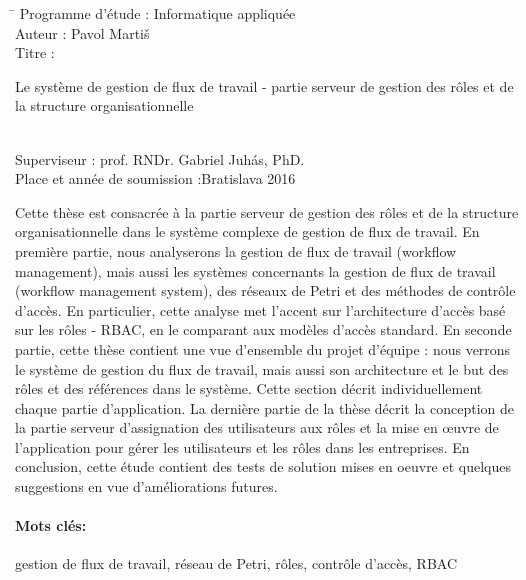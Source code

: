 \documentclass[12pt, oneside]{book}
\def\mfautor{Pavol Martiš}
\begin{document}
\begin{tabbing}	
	\hspace*{7cm}\= \kill
	Programme d'étude :\> Informatique appliquée \\
	Auteur :\> \mfautor\\
	Titre :\>
	\begin{minipage}[t]{20em}
	Le système de gestion de flux de travail - partie serveur de gestion des rôles et de la structure organisationnelle
	\end{minipage} \\
	Superviseur :\> prof. RNDr. Gabriel Juhás, PhD.\\
	
	Place et année de soumission :\>Bratislava 2016
\end{tabbing}
Cette thèse est consacrée à la partie serveur de gestion des rôles et de la structure organisationnelle dans le système complexe de gestion de flux de travail.
En première partie, nous analyserons la gestion de flux de travail (workflow management), mais aussi les systèmes concernants la gestion de flux de travail (workflow management system), des réseaux de Petri et des méthodes de contrôle d'accès. En particulier, cette analyse met l'accent sur l'architecture d'accès basé sur les rôles - RBAC, en le comparant aux modèles d'accès standard.
En seconde partie, cette thèse contient une vue d'ensemble du projet d'équipe : nous verrons le système de gestion du flux de travail, mais aussi son architecture et le but des rôles et des références dans le système. Cette section décrit individuellement chaque partie d'application.
La dernière partie de la thèse décrit la conception de la partie serveur d'assignation des utilisateurs aux rôles et la mise en œuvre de l'application pour gérer les utilisateurs et les rôles dans les entreprises. En conclusion, cette étude contient des tests de solution mises en oeuvre et quelques suggestions en vue d'améliorations futures.



\paragraph*{Mots clés:}  gestion de flux de travail, réseau de Petri, rôles, contrôle d'accès, RBAC


%
%
\end{document}
